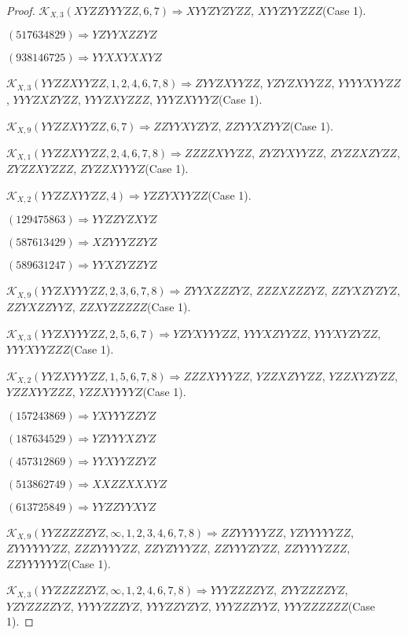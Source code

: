 \documentclass[12pt]{article}
\theoremstyle{plain}
\theoremstyle{definition}
\theoremstyle{remark}
\newcommand{\fancy}[1]{\mathcal{#1}}
\def\K{\fancy{K}}
\begin{document}
\begin{proof}
	$\K_{X,3}(XYZZYYYZZ,6, 7)\Rightarrow $$XYYZYZYZZ$, $XYYZYYZZZ$(Case 1).
	
	
	
	$(5 1 7 6 3 4 8 2 9)\Rightarrow YZYYXZZYZ$
	
	$(9 3 8 1 4 6 7 2 5)\Rightarrow YYXXYXXYZ$
	
	
	
	$\K_{X,3}(YYZZXYYZZ,1, 2, 4, 6, 7, 8)\Rightarrow $$ZYYZXYYZZ$, $YZYZXYYZZ$, $YYYYXYYZZ$, $YYYZXZYZZ$, $YYYZXYZZZ$, $YYYZXYYYZ$(Case 1).
	
	$\K_{X,9}(YYZZXYYZZ,6, 7)\Rightarrow $$ZZYYXYZYZ$, $ZZYYXZYYZ$(Case 1).
	
	$\K_{X,1}(YYZZXYYZZ,2, 4, 6, 7, 8)\Rightarrow $$ZZZZXYYZZ$, $ZYZYXYYZZ$, $ZYZZXZYZZ$, $ZYZZXYZZZ$, $ZYZZXYYYZ$(Case 1).
	
	$\K_{X,2}(YYZZXYYZZ,4)\Rightarrow $$YZZYXYYZZ$(Case 1).
	
	
	
	$(1 2 9 4 7 5 8 6 3)\Rightarrow YYZZYZXYZ$
	
	$(5 8 7 6 1 3 4 2 9)\Rightarrow XZYYYZZYZ$
	
	$(5 8 9 6 3 1 2 4 7)\Rightarrow YYXZYZZYZ$
	
	
	
	$\K_{X,9}(YYZXYYYZZ,2, 3, 6, 7, 8)\Rightarrow $$ZYYXZZZYZ$, $ZZZXZZZYZ$, $ZZYXZYZYZ$, $ZZYXZZYYZ$, $ZZXYZZZZZ$(Case 1).
	
	$\K_{X,3}(YYZXYYYZZ,2, 5, 6, 7)\Rightarrow $$YZYXYYYZZ$, $YYYXZYYZZ$, $YYYXYZYZZ$, $YYYXYYZZZ$(Case 1).
	
	$\K_{X,2}(YYZXYYYZZ,1, 5, 6, 7, 8)\Rightarrow $$ZZZXYYYZZ$, $YZZXZYYZZ$, $YZZXYZYZZ$, $YZZXYYZZZ$, $YZZXYYYYZ$(Case 1).
	
	
	
	$(1 5 7 2 4 3 8 6 9)\Rightarrow YXYYYZZYZ$
	
	$(1 8 7 6 3 4 5 2 9)\Rightarrow YZYYYXZYZ$
	
	$(4 5 7 3 1 2 8 6 9)\Rightarrow YYXYYZZYZ$
	
	$(5 1 3 8 6 2 7 4 9)\Rightarrow XXZZXXXYZ$
	
	$(6 1 3 7 2 5 8 4 9)\Rightarrow YYZZYYXYZ$
	
	
	
	$\K_{X,9}(YYZZZZZYZ,\infty,1, 2, 3, 4, 6, 7, 8)\Rightarrow $$ZZYYYYYZZ$, $YZYYYYYZZ$, $ZYYYYYYZZ$, $ZZZYYYYZZ$, $ZZYZYYYZZ$, $ZZYYYZYZZ$, $ZZYYYYZZZ$, $ZZYYYYYYZ$(Case 1).
	
	$\K_{X,3}(YYZZZZZYZ,\infty,1, 2, 4, 6, 7, 8)\Rightarrow $$YYYZZZZYZ$, $ZYYZZZZYZ$, $YZYZZZZYZ$, $YYYYZZZYZ$, $YYYZZYZYZ$, $YYYZZZYYZ$, $YYYZZZZZZ$(Case 1).
	

\end{proof}
\end{document}
